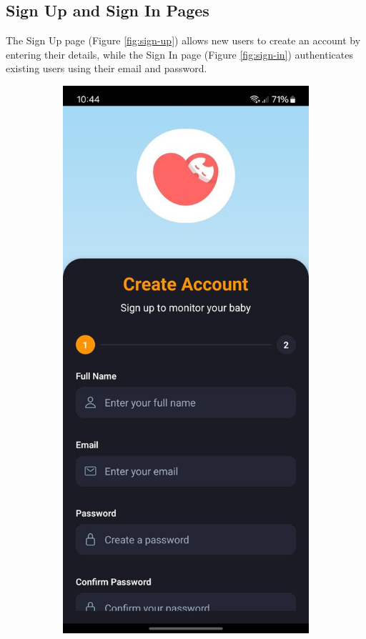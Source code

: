 \documentclass[12pt,a4paper]{report}
\begin{document}
\subsection{Sign Up and Sign In Pages}
The Sign Up page (Figure \ref{fig:sign-up}) allows new users to create an account by entering their details, while the Sign In page (Figure \ref{fig:sign-in}) authenticates existing users using their email and password.
\begin{figure}[htbp]
  \centering
  \begin{subfigure}[b]{0.22\textwidth}
    \centering
    \includegraphics[width=\textwidth]{./pic/sign-up.jpeg}

\end{subfigure}
\end{figure}
\end{document}
